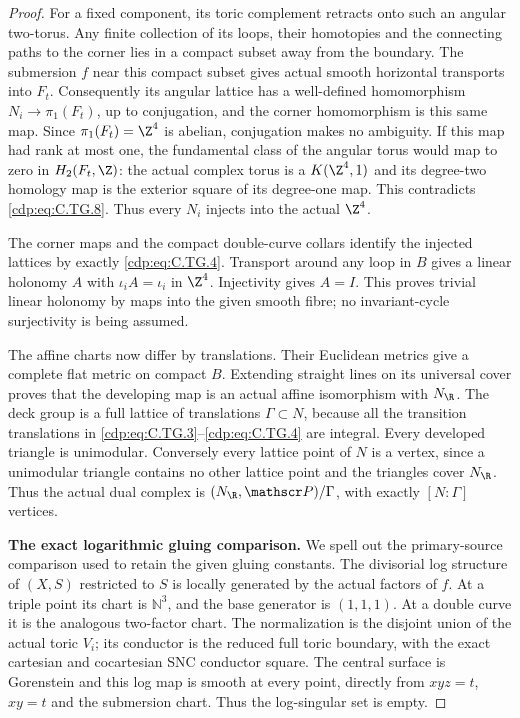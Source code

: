 \begin{proof}
For a fixed component, its toric complement retracts
onto such an angular two-torus. Any finite collection
of its loops, their homotopies and the connecting
paths to the corner lies in a compact subset away
from the boundary. The submersion $f$ near this
compact subset gives actual smooth horizontal
transports into $F_t$. Consequently its angular
lattice has a well-defined homomorphism
$N_i\to\pi_1(F_t)$, up to conjugation, and the
corner homomorphism is this same map. Since
$\pi_1(F_t)=\Z^4$ is abelian, conjugation makes
no ambiguity. If this map had rank at most one,
the fundamental class of the angular torus would
map to zero in $H_2(F_t,\Z)$: the actual complex
torus is a $K(\Z^4,1)$ and its degree-two homology
map is the exterior square of its degree-one map.
This contradicts \eqref{cdp:eq:C.TG.8}. Thus every $N_i$
injects into the actual $\Z^4$.

The corner maps and the compact double-curve collars
identify the injected lattices by exactly \eqref{cdp:eq:C.TG.4}.
Transport around any loop in $B$ gives a linear
holonomy $A$ with $\iota_iA=\iota_i$ in $\Z^4$.
Injectivity gives $A=I$. This proves trivial linear
holonomy by maps into the given smooth fibre; no
invariant-cycle surjectivity is being assumed.

The affine charts now differ by translations.
Their Euclidean metrics give a complete flat metric
on compact $B$. Extending straight lines on its
universal cover proves that the developing map is
an actual affine isomorphism with $N_{\R}$.
The deck group is a full lattice of translations
$\Gamma\subset N$, because all the transition
translations in \eqref{cdp:eq:C.TG.3}--\eqref{cdp:eq:C.TG.4} are integral.
Every developed triangle is unimodular. Conversely
every lattice point of $N$ is a vertex, since a
unimodular triangle contains no other lattice point
and the triangles cover $N_{\R}$. Thus the actual
dual complex is $(N_{\R},\mathscr P)/\Gamma$,
with exactly $[N:\Gamma]$ vertices.

\par\medskip\noindent\textbf{The exact logarithmic gluing comparison.}
We spell out the primary-source comparison used to
retain the given gluing constants. The divisorial
log structure of $(X,S)$ restricted to $S$ is locally
generated by the actual factors of $f$. At a triple
point its chart is $\mathbb N^3$, and the base generator
is $(1,1,1)$. At a double curve it is the analogous
two-factor chart. The normalization is the disjoint
union of the actual toric $V_i$; its conductor is
the reduced full toric boundary, with the exact
cartesian and cocartesian SNC conductor square.
The central surface is Gorenstein and this log
map is smooth at every point, directly from
$xyz=t$, $xy=t$ and the submersion chart. Thus
the log-singular set is empty.


\end{proof}
